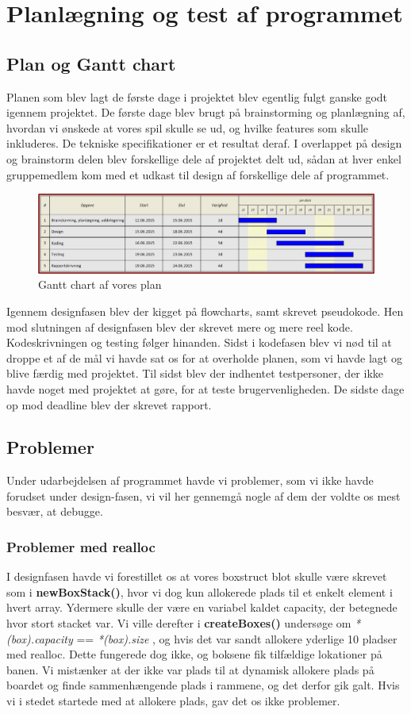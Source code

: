 \section{Planlægning og test af programmet}
\subsection{Plan og Gantt chart}
Planen som blev lagt de første dage i projektet blev egentlig fulgt ganske godt igennem projektet. De første dage blev brugt på brainstorming og planlægning af, hvordan vi ønskede at vores spil skulle se ud, og hvilke features som skulle inkluderes. De tekniske specifikationer er et resultat deraf. I overlappet på design og brainstorm delen blev forskellige dele af projektet delt ud, sådan at hver enkel gruppemedlem kom med et udkast til design af forskellige dele af programmet.
\begin{figure}[h]
\begin{center}
\includegraphics[scale=0.7]{img/Gantt_Chart.png}
\caption{Gantt chart af vores plan}
\end{center}
\end{figure}
 Igennem designfasen blev der kigget på flowcharts, samt skrevet pseudokode. Hen mod slutningen af designfasen blev der skrevet mere og mere reel kode. Kodeskrivningen og testing følger hinanden. Sidst i kodefasen blev vi nød til at droppe et af de mål vi havde sat os for at overholde planen, som vi havde lagt og blive færdig med projektet. Til sidst blev der indhentet testpersoner, der ikke havde noget med projektet at gøre, for at teste brugervenligheden.  De sidste dage op mod deadline blev der skrevet rapport. 
\subsection{Problemer}
Under udarbejdelsen af programmet havde vi problemer, som vi ikke havde forudset under design-fasen, vi vil her gennemgå nogle af dem der voldte os mest besvær, at debugge.
\subsubsection{Problemer med realloc}
\label{reallocfejl}
I designfasen havde vi forestillet os at vores boxstruct blot skulle være skrevet som i \textbf{newBoxStack()}, hvor vi dog kun allokerede plads til et enkelt element i hvert array. Ydermere skulle der være en variabel kaldet capacity, der betegnede hvor stort stacket var. Vi ville derefter i \textbf{createBoxes()} undersøge om \textit{*(box).capacity} == \textit{*(box).size} , og hvis det var sandt allokere yderlige 10 pladser med realloc. Dette fungerede dog ikke, og boksene fik tilfældige lokationer på banen. Vi mistænker at der ikke var plads til at dynamisk allokere plads på boardet og finde sammenhængende plads i rammene, og det derfor gik galt. Hvis vi i stedet startede med at allokere plads, gav det os ikke problemer.
